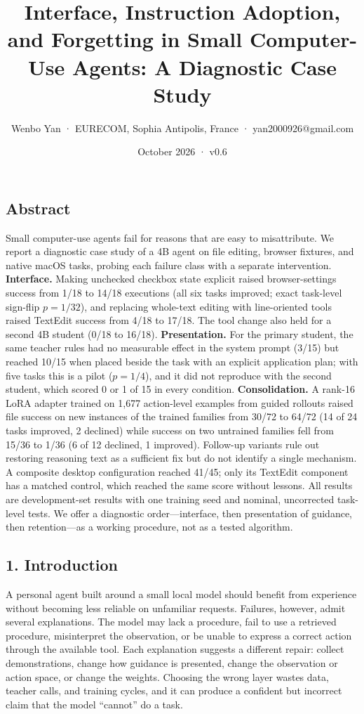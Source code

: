 \documentclass[
  10pt,
]{article}
\title{Interface, Instruction Adoption, and Forgetting in Small
Computer-Use Agents: A Diagnostic Case Study}
\author{Wenbo Yan · EURECOM, Sophia Antipolis, France ·
yan2000926@gmail.com}
\date{October 2026 · v0.6}
\begin{document}
\maketitle

\subsection{Abstract}\label{abstract}

Small computer-use agents fail for reasons that are easy to
misattribute. We report a diagnostic case study of a 4B agent on file
editing, browser fixtures, and native macOS tasks, probing each failure
class with a separate intervention. \textbf{Interface.} Making unchecked
checkbox state explicit raised browser-settings success from 1/18 to
14/18 executions (all six tasks improved; exact task-level sign-flip
\(p=1/32\)), and replacing whole-text editing with line-oriented tools
raised TextEdit success from 4/18 to 17/18. The tool change also held
for a second 4B student (0/18 to 16/18). \textbf{Presentation.} For the
primary student, the same teacher rules had no measurable effect in the
system prompt (3/15) but reached 10/15 when placed beside the task with
an explicit application plan; with five tasks this is a pilot
(\(p=1/4\)), and it did not reproduce with the second student, which
scored 0 or 1 of 15 in every condition. \textbf{Consolidation.} A
rank-16 LoRA adapter trained on 1,677 action-level examples from guided
rollouts raised file success on new instances of the trained families
from 30/72 to 64/72 (14 of 24 tasks improved, 2 declined) while success
on two untrained families fell from 15/36 to 1/36 (6 of 12 declined, 1
improved). Follow-up variants rule out restoring reasoning text as a
sufficient fix but do not identify a single mechanism. A composite
desktop configuration reached 41/45; only its TextEdit component has a
matched control, which reached the same score without lessons. All
results are development-set results with one training seed and nominal,
uncorrected task-level tests. We offer a diagnostic order---interface,
then presentation of guidance, then retention---as a working procedure,
not as a tested algorithm.

\subsection{1. Introduction}\label{introduction}

A personal agent built around a small local model should benefit from
experience without becoming less reliable on unfamiliar requests.
Failures, however, admit several explanations. The model may lack a
procedure, fail to use a retrieved procedure, misinterpret the
observation, or be unable to express a correct action through the
available tool. Each explanation suggests a different repair: collect
demonstrations, change how guidance is presented, change the observation
or action space, or change the weights. Choosing the wrong layer wastes
data, teacher calls, and training cycles, and it can produce a confident
but incorrect claim that the model ``cannot'' do a task.
\end{document}
